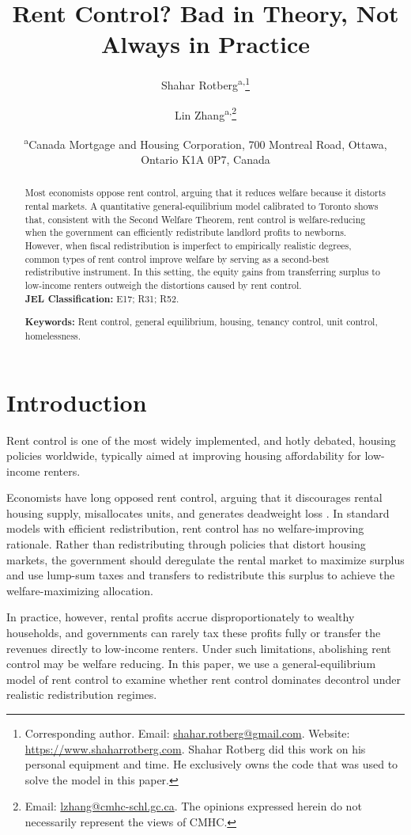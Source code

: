 \documentclass[parskip=full]{article}
\title{\vspace{-1.8cm}Rent Control? Bad in Theory, Not Always in Practice}
\author{Shahar Rotberg\textsuperscript{a,}\footnote{Corresponding author. Email: \url{shahar.rotberg@gmail.com}. Website: \url{https://www.shaharrotberg.com}. Shahar Rotberg did this work on his personal equipment and time. He exclusively owns the code that was used to solve the model in this paper.} \and Lin Zhang\textsuperscript{a,}\footnote{Email: \url{lzhang@cmhc-schl.gc.ca}. The opinions expressed herein do not necessarily represent the views of CMHC.}}
\date{\normalsize\textsuperscript{a}Canada Mortgage and Housing Corporation, 700 Montreal Road, Ottawa, Ontario K1A 0P7, Canada}
\begin{document}
\maketitle

\begin{abstract}
\onehalfspacing

\noindent Most economists oppose rent control, arguing that it reduces welfare because it distorts rental markets. A quantitative general-equilibrium model calibrated to Toronto shows that, consistent with the Second Welfare Theorem, rent control is welfare-reducing when the government can efficiently redistribute landlord profits to newborns. However, when fiscal redistribution is imperfect to empirically realistic degrees, common types of rent control improve welfare by serving as a second-best redistributive instrument. In this setting, the equity gains from transferring surplus to low-income renters outweigh the distortions caused by rent control.
\\[1.5ex]

\noindent \textbf{JEL Classification:} E17; R31; R52.

\noindent \textbf{Keywords:} Rent control, general equilibrium, housing, tenancy control, unit control, homelessness.
\end{abstract}

\section{Introduction}

Rent control is one of the most widely implemented, and hotly debated, housing policies worldwide, typically aimed at improving housing affordability for low-income renters.

Economists have long opposed rent control, arguing that it discourages rental housing supply, misallocates units, and generates deadweight loss \citep{gl-2003}. In standard models with efficient redistribution, rent control has no welfare-improving rationale. Rather than redistributing through policies that distort housing markets, the government should deregulate the rental market to maximize surplus and use lump-sum taxes and transfers to redistribute this surplus to achieve the welfare-maximizing allocation.

In practice, however, rental profits accrue disproportionately to wealthy households, and governments can rarely tax these profits fully or transfer the revenues directly to low-income renters. Under such limitations, abolishing rent control may be welfare reducing. In this paper, we use a general-equilibrium model of rent control to examine whether rent control dominates decontrol under realistic redistribution regimes.
\end{document}
